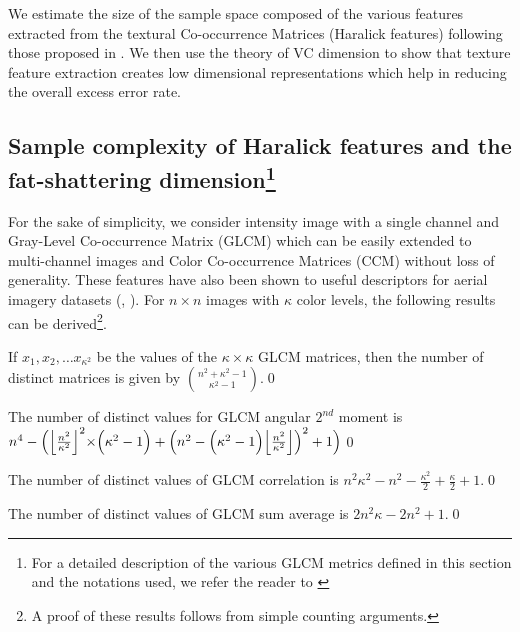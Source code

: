 \documentclass[11pt,a4paper]{article}
\DeclarePairedDelimiter\floor{\lfloor}{\rfloor}
\begin{document}
We estimate the size of the sample space composed of the various features extracted from the  textural Co-occurrence Matrices (Haralick features) following those proposed in \cite{haralick1973}. We then use the theory of VC dimension to show that texture feature extraction creates low dimensional representations which help in reducing the overall excess error rate.     

\subsection[Sample complexity of Haralick features and the fat-shattering dimension]{Sample complexity of Haralick features and the \\ fat-shattering dimension\footnote{For a detailed description of the various GLCM metrics defined in this section and the notations used, we refer the reader to \cite{haralick1973}}}

 For the sake of simplicity, we consider intensity image with a single channel and Gray-Level Co-occurrence Matrix (GLCM) which can be easily extended to multi-channel images and Color Co-occurrence Matrices (CCM) without loss of generality. These features have also been shown to useful descriptors for aerial imagery datasets (\cite{basu2015deepsat}, \cite{basu2015semiautomated}). For $n{\times}n$ images with $\kappa$ color levels, the following results can be derived\footnote{A proof of these results follows from simple counting arguments.}.  

\begin{proposition}
If $x_1, x_2, \ldots x_{\kappa^2}$ be the values of the $\kappa{\times}\kappa$ GLCM matrices, then the number of distinct matrices is given by $\binom{n^2+\kappa^2-1}{\kappa^2-1}$.\qed
\end{proposition}

\begin{proposition}\label{GLCM_angular}
The number of distinct values for GLCM angular $2^{nd}$ moment is $n^4 - \Big({\floor*{\frac{n^2}{\kappa^2}}}^2{\times}\Big(\kappa^2-1\Big)+\Big(n^2-\Big(\kappa^2-1\Big)\floor*{\frac{n^2}{\kappa^2}}\Big)^2+1\Big)$\qed
\end{proposition}

\begin{proposition}
The number of distinct values of GLCM correlation is $n^2\kappa^2-n^2-\frac{\kappa^2}{2}+\frac{\kappa}{2}+1$.\qed
\end{proposition}

\begin{proposition}
The number of distinct values of GLCM sum average is $2n^2\kappa-2n^2+1$.\qed
\end{proposition}
\end{document}
